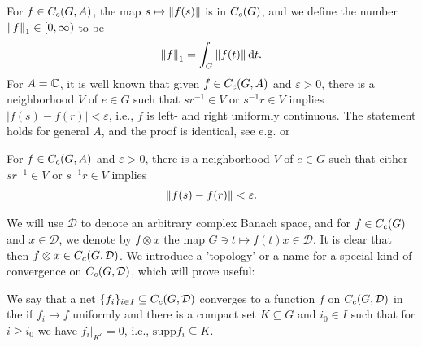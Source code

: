 For $f \in C_c(G,A)$, the map $s \mapsto \left\lVert f(s) \right\rVert$ is in $C_c(G)$, and we define the number $\left\lVert f \right\rVert_1 \in [0,\infty)$ to be
\begin{align*}
	\left\lVert f \right\rVert_1 = \int_G \left\lVert f(t) \right\rVert \mathrm{d} t.
\end{align*}
For $A= \mathbb{C}$, it is well known that given $f \in C_c(G,A)$ and $\varepsilon > 0$, there is a neighborhood $V$ of $e \in G$ such that $sr^{-1} \in V$ or $s^{-1}r \in V$ implies $| f(s) - f(r)| < \varepsilon$, i.e., $f$ is left- and right uniformly continuous. The statement holds for general $A$, and the proof is identical, see e.g. \cite[Proposition 2.6]{folland2016fourier} or \cite[Lemma 1.88]{williamscrossed}
\begin{lemma}
	For $f \in C_c(G,A)$ and $\varepsilon>0$, there is a neighborhood $V$ of $e \in G$ such that either $sr^{-1} \in V$ or $s^{-1}r \in V$ implies
	\begin{align*}
		\left\lVert f(s)  - f(r) \right\rVert < \varepsilon.
	\end{align*}
	\label{int:lrunicont}
\end{lemma}

We will use $\mathcal{D}$ to denote an arbitrary complex Banach space, and for $f \in C_c(G)$ and $x \in \mathcal{D}$, we denote by $f \otimes x$ the map $G \ni t \mapsto f(t)x \in \mathcal{D}$. It is clear that then $f \otimes x \in C_c(G,\mathcal{D})$. We introduce a 'topology' or a name for a special kind of convergence on $C_c(G,\mathcal{D})$, which will prove useful:
\begin{definition}
	We say that a net $\{f_i\}_{i \in I} \subseteq C_c(G,\mathcal{D})$ converges to a function $f$ on $C_c(G,\mathcal{D})$ in the  if $f_i \to f$ uniformly and there is a compact set $K \subseteq G$ and $i_0 \in I$ such that for $i \geq i_0$ we have $f_i \big|_{K^c} = 0$, i.e., $\mathrm{supp} f_i \subseteq K$.
\end{definition}

